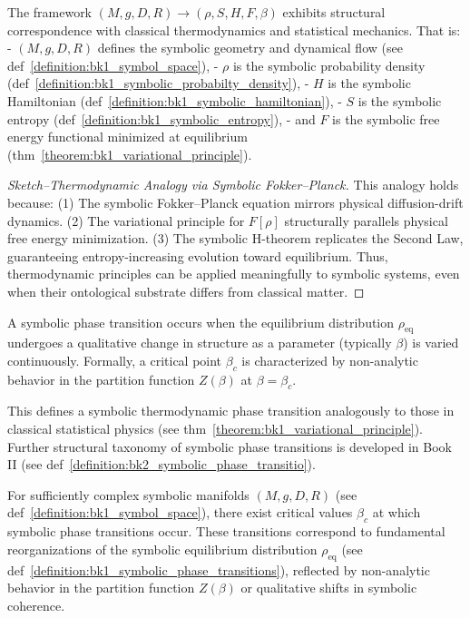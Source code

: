 \begin{theorem}
\label{theorem:bk1_sructurual_correspondence}
The framework $(M, g, D, R) \to (\rho, S, H, F, \beta)$ exhibits structural correspondence with classical thermodynamics and statistical mechanics. That is:
- $(M, g, D, R)$ defines the symbolic geometry and dynamical flow (see def~\ref{definition:bk1_symbol_space}),
- $\rho$ is the symbolic probability density (def~\ref{definition:bk1_symbolic_probabilty_density}),
- $H$ is the symbolic Hamiltonian (def~\ref{definition:bk1_symbolic_hamiltonian}),
- $S$ is the symbolic entropy (def~\ref{definition:bk1_symbolic_entropy}),
- and $F$ is the symbolic free energy functional minimized at equilibrium (thm~\ref{theorem:bk1_variational_principle}).

\begin{proof}[Sketch–Thermodynamic Analogy via Symbolic Fokker–Planck]
\label{proof:bk1_sketch_thermo_analogy_fokker_planck}
This analogy holds because: (1) The symbolic Fokker–Planck equation mirrors physical diffusion-drift dynamics. (2) The variational principle for $F[\rho]$ structurally parallels physical free energy minimization. (3) The symbolic H-theorem replicates the Second Law, guaranteeing entropy-increasing evolution toward equilibrium. Thus, thermodynamic principles can be applied meaningfully to symbolic systems, even when their ontological substrate differs from classical matter.
\end{proof}
\end{theorem}

\begin{definition}
\label{definition:bk1_symbolic_phase_transitions}
A symbolic phase transition occurs when the equilibrium distribution $\rho_{\text{eq}}$ undergoes a qualitative change in structure as a parameter (typically $\beta$) is varied continuously. Formally, a critical point $\beta_c$ is characterized by non-analytic behavior in the partition function $Z(\beta)$ at $\beta = \beta_c$.

This defines a symbolic thermodynamic phase transition analogously to those in classical statistical physics (see thm~\ref{theorem:bk1_variational_principle}). Further structural taxonomy of symbolic phase transitions is developed in Book II (see def~\ref{definition:bk2_symbolic_phase_transitio}).
\end{definition}
\begin{conjecture}
\label{conjecture:bk1_existence_of_symbolic_phase_transitions}
For sufficiently complex symbolic manifolds $(M, g, D, R)$ (see def~\ref{definition:bk1_symbol_space}), there exist critical values $\beta_c$ at which symbolic phase transitions occur. These transitions correspond to fundamental reorganizations of the symbolic equilibrium distribution $\rho_{\text{eq}}$ (see def~\ref{definition:bk1_symbolic_phase_transitions}), reflected by non-analytic behavior in the partition function $Z(\beta)$ or qualitative shifts in symbolic coherence.
\end{conjecture}

